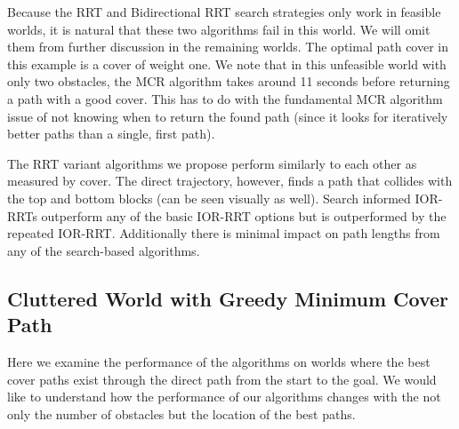 
Because the RRT and Bidirectional RRT search strategies only work in feasible worlds, it is natural that these two algorithms fail in this world. We will omit them from further discussion in the remaining worlds. The optimal path cover in this example is a cover of weight one. We note that in this unfeasible world with only two obstacles, the MCR algorithm takes around 11 seconds before returning a path with a good cover. This has to do with the fundamental MCR algorithm issue of not knowing when to return the found path (since it looks for iteratively better paths than a single, first path). 

The RRT variant algorithms we propose perform similarly to each other as measured by cover. The direct trajectory, however, finds a path that collides with the top and bottom blocks (can be seen visually as well). Search informed IOR-RRTs outperform any of the basic IOR-RRT options but is outperformed by the repeated IOR-RRT. Additionally there is minimal impact on path lengths from any of the search-based algorithms.

\subsection{Cluttered World with Greedy Minimum Cover Path} \label{res:cluttered_world}
Here we examine the performance of the algorithms on worlds where the best cover paths exist through the direct path from the start to the goal. We would like to understand how the performance of our algorithms changes with the not only the number of obstacles but the location of the best paths.

